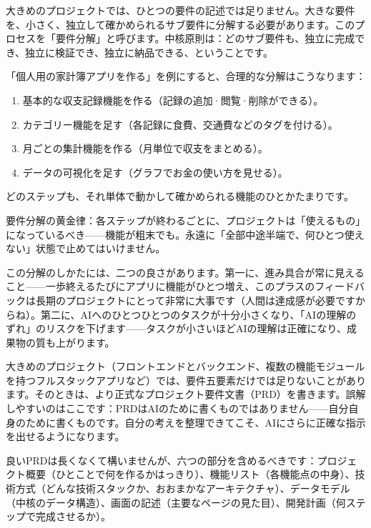 
大きめのプロジェクトでは、ひとつの要件の記述では足りません。大きな要件を、小さく、独立して確かめられるサブ要件に分解する必要があります。このプロセスを「要件分解」と呼びます。中核原則は：どのサブ要件も、独立に完成でき、独立に検証でき、独立に納品できる、ということです。

「個人用の家計簿アプリを作る」を例にすると、合理的な分解はこうなります：

\begin{enumerate}
  \item 基本的な収支記録機能を作る（記録の追加·閲覧·削除ができる）。
  \item カテゴリー機能を足す（各記録に食費、交通費などのタグを付ける）。
  \item 月ごとの集計機能を作る（月単位で収支をまとめる）。
  \item データの可視化を足す（グラフでお金の使い方を見せる）。
\end{enumerate}

どのステップも、それ単体で動かして確かめられる機能のひとかたまりです。

要件分解の黄金律：各ステップが終わるごとに、プロジェクトは「使えるもの」になっているべき——機能が粗末でも。永遠に「全部中途半端で、何ひとつ使えない」状態で止めてはいけません。

この分解のしかたには、二つの良さがあります。第一に、進み具合が常に見えること——一歩終えるたびにアプリに機能がひとつ増え、このプラスのフィードバックは長期のプロジェクトにとって非常に大事です（人間は達成感が必要ですからね）。第二に、AIへのひとつひとつのタスクが十分小さくなり、「AIの理解のずれ」のリスクを下げます——タスクが小さいほどAIの理解は正確になり、成果物の質も上がります。


大きめのプロジェクト（フロントエンドとバックエンド、複数の機能モジュールを持つフルスタックアプリなど）では、要件五要素だけでは足りないことがあります。そのときは、より正式なプロジェクト要件文書（PRD）を書きます。誤解しやすいのはここです：PRDはAIのために書くものではありません——自分自身のために書くものです。自分の考えを整理できてこそ、AIにさらに正確な指示を出せるようになります。

良いPRDは長くなくて構いませんが、六つの部分を含めるべきです：プロジェクト概要（ひとことで何を作るかはっきり）、機能リスト（各機能点の中身）、技術方式（どんな技術スタックか、おおまかなアーキテクチャ）、データモデル（中核のデータ構造）、画面の記述（主要なページの見た目）、開発計画（何ステップで完成させるか）。

